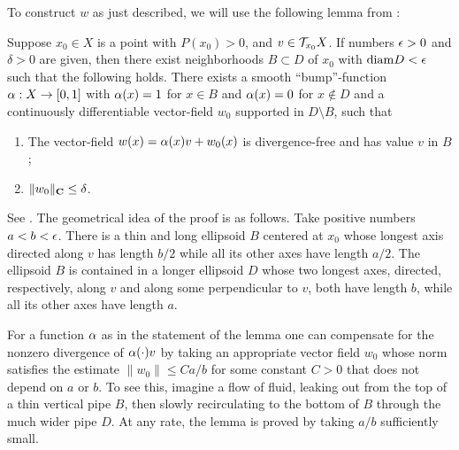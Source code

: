 To construct $w$ as just described,  we will use
the following lemma from \cite{clms}:
\begin{lem}
Suppose 
$x_0\in X$ is a point with $P(x_0)>0$,
and $v\in{\cal{T}}_{x_0}X$. If 
numbers  $\epsilon > 0$ and $\delta>0$ are given, then
there exist neighborhoods $B\subset D$ of $x_0$ with  
${\operatorname{diam}} {D} < \epsilon$  such that the following holds. 
There exists a smooth ``bump''-function
$\alpha:X\to [0,1]$ with $\alpha(x) = 1$ for $x\in B$ and 
$\alpha (x) =0$ for $x\not\in D$
and a continuously differentiable vector-field $w_0$ 
supported in $D\setminus B$, 
such that
\begin{enumerate}
\item
The vector-field $w(x) = \alpha(x) v+w_0 (x)$ is divergence-free and has
value $v$ in $B$;
\item
$\| w_0 \|_{{\bold C}} \leq \delta$.
\end{enumerate}
\end{lem}
\begin{pf} See \cite[Lemma~2.3]{clms}.
The geometrical idea of the proof is as follows.
Take positive numbers $a<b<\epsilon$.
There is a thin and
long ellipsoid $B$ centered at $x_0$ 
whose longest axis  directed along $v$ has length $b/2$  while
all its other  axes have length $a/2$. The ellipsoid
$B$ is contained in a longer ellipsoid $D$ whose 
two longest axes, directed, respectively, along $v$
and along some perpendicular to $v$, both have length $b$,
while all its other axes have length $a$.
  
For a function $\alpha$ as in the statement of the lemma
one can compensate for the nonzero
divergence of $\alpha(\cdot)v$ by taking an appropriate
vector field
$w_0$ whose norm satisfies the estimate
$\|w_0\|\leq Ca/b$ for some constant  $C>0$  that does not
depend on $a$ or $b$.
To see this, imagine a flow of fluid, 
leaking out from the top of a thin vertical pipe $B$, 
then slowly recirculating to the bottom of $B$ 
through the much wider pipe $D$.
At any rate, the lemma is proved by taking  $a/b$ sufficiently small. 
\end{pf}

